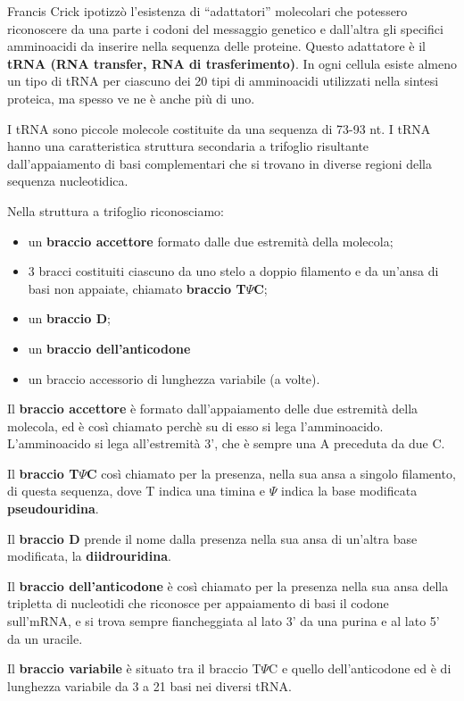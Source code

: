 \documentclass[11pt]{book}
\begin{document}
Francis Crick ipotizzò l'esistenza di ``adattatori'' molecolari che
potessero riconoscere da una parte i codoni del messaggio genetico e
dall'altra gli specifici amminoacidi da inserire nella sequenza delle
proteine. Questo adattatore è il \textbf{tRNA (RNA transfer, RNA di
trasferimento)}. In ogni cellula esiste almeno un tipo di tRNA per
ciascuno dei 20 tipi di amminoacidi utilizzati nella sintesi proteica,
ma spesso ve ne è anche più di uno.

I tRNA sono piccole molecole costituite da una sequenza di 73-93 nt. I
tRNA hanno una caratteristica struttura secondaria a trifoglio
risultante dall'appaiamento di basi complementari che si trovano in
diverse regioni della sequenza nucleotidica.

Nella struttura a trifoglio riconosciamo:

\begin{itemize}
\itemsep1pt\parskip0pt
\item
  un \textbf{braccio accettore} formato dalle due estremità della
  molecola;
\item
  3 bracci costituiti ciascuno da uno stelo a doppio filamento e da
  un'ansa di basi non appaiate, chiamato \textbf{braccio T\(\Psi\)C};
\item
  un \textbf{braccio D};
\item
  un \textbf{braccio dell'anticodone}
\item
  un braccio accessorio di lunghezza variabile (a volte).
\end{itemize}

Il \textbf{braccio accettore} è formato dall'appaiamento delle due
estremità della molecola, ed è così chiamato perchè su di esso si lega
l'amminoacido. L'amminoacido si lega all'estremità 3', che è sempre una
A preceduta da due C.

Il \textbf{braccio T\(\Psi\)C} così chiamato per la presenza, nella sua
ansa a singolo filamento, di questa sequenza, dove T indica una timina e
\(\Psi\) indica la base modificata \textbf{pseudouridina}.

Il \textbf{braccio D} prende il nome dalla presenza nella sua ansa di
un'altra base modificata, la \textbf{diidrouridina}.

Il \textbf{braccio dell'anticodone} è così chiamato per la presenza
nella sua ansa della tripletta di nucleotidi che riconosce per
appaiamento di basi il codone sull'mRNA, e si trova sempre fiancheggiata
al lato 3' da una purina e al lato 5' da un uracile.

Il \textbf{braccio variabile} è situato tra il braccio T\(\Psi\)C e
quello dell'anticodone ed è di lunghezza variabile da 3 a 21 basi nei
diversi tRNA.
\end{document}
